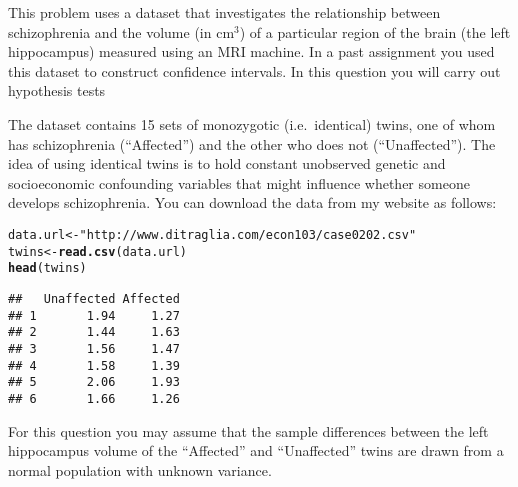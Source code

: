 \documentclass[addpoints,12pt]{exam}\usepackage[]{graphicx}\usepackage[]{color}
\makeatletter
\newcommand{\hlstr}[1]{\textcolor[rgb]{0.192,0.494,0.8}{#1}}%
\newcommand{\hlstd}[1]{\textcolor[rgb]{0.345,0.345,0.345}{#1}}%
\newcommand{\hlkwb}[1]{\textcolor[rgb]{0.69,0.353,0.396}{#1}}%
\newcommand{\hlkwd}[1]{\textcolor[rgb]{0.737,0.353,0.396}{\textbf{#1}}}%
\newenvironment{kframe}{%
 \def\at@end@of@kframe{}%
 \ifinner\ifhmode%
  \def\at@end@of@kframe{\end{minipage}}%
  \begin{minipage}{\columnwidth}%
 \fi\fi%
 \def\FrameCommand##1{\hskip\@totalleftmargin \hskip-\fboxsep
 \colorbox{shadecolor}{##1}\hskip-\fboxsep
     \hskip-\linewidth \hskip-\@totalleftmargin \hskip\columnwidth}%
 \MakeFramed {\advance\hsize-\width
   \@totalleftmargin\z@ \linewidth\hsize
   \@setminipage}}%
 {\par\unskip\endMakeFramed%
 \at@end@of@kframe}
\newenvironment{knitrout}{}{} %
\makeatother
\begin{document}
\begin{questions}
\question This problem uses a dataset that investigates the relationship between schizophrenia and the volume (in cm$^3$) of a particular region of the brain (the left hippocampus) measured using an MRI machine. In a past assignment you used this dataset to construct confidence intervals. In this question you will carry out hypothesis tests

The dataset contains 15 sets of monozygotic (i.e.\ identical) twins, one of whom has schizophrenia (``Affected'') and the other who does not (``Unaffected''). The idea of using identical twins is to hold constant unobserved genetic and socioeconomic confounding variables that might influence whether someone develops schizophrenia. You can download the data from my website as follows:
\begin{knitrout}
\color{fgcolor}\begin{kframe}
\begin{alltt}
\hlstd{data.url} \hlkwb{<-} \hlstr{"http://www.ditraglia.com/econ103/case0202.csv"}
\hlstd{twins} \hlkwb{<-} \hlkwd{read.csv}\hlstd{(data.url)}
\hlkwd{head}\hlstd{(twins)}
\end{alltt}
\begin{verbatim}
##   Unaffected Affected
## 1       1.94     1.27
## 2       1.44     1.63
## 3       1.56     1.47
## 4       1.58     1.39
## 5       2.06     1.93
## 6       1.66     1.26
\end{verbatim}
\end{kframe}
\end{knitrout}
For this question you may assume that the sample differences between the left hippocampus volume of the ``Affected'' and ``Unaffected'' twins are drawn from a normal population with unknown variance.
	\begin{parts}

\end{parts}
\end{questions}
\end{document}
